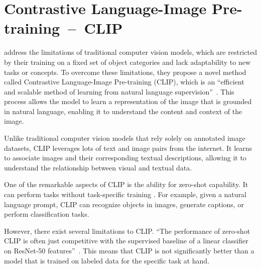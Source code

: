 \section{Contrastive Language-Image Pre-training~--~CLIP}\label{CLIP}

\citeauthor{radfordCLIP} address the limitations of traditional computer vision models, which are restricted by their training on a fixed set of object categories and lack adaptability to new tasks or concepts. To overcome these limitations, they propose a novel method called Contrastive Language-Image Pre-training (CLIP), which is an ``efficient and scalable method of learning from natural language supervision''~\citep{radfordCLIP}. This process allows the model to learn a representation of the image that is grounded in natural language, enabling it to understand the content and context of the image.

Unlike traditional computer vision models that rely solely on annotated image datasets, CLIP leverages lots of text and image pairs from the internet. It learns to associate images and their corresponding textual descriptions, allowing it to understand the relationship between visual and textual data.

One of the remarkable aspects of CLIP is the ability for zero-shot capability. It can perform tasks without task-specific training \citep{radfordCLIP}. For example, given a natural language prompt, CLIP can recognize objects in images, generate captions, or perform classification tasks.

However, there exist several limitations to CLIP\@. ``The performance of zero-shot CLIP is often just competitive with the supervised baseline of a linear classifier on ResNet-50 features''~\citep{radfordCLIP}.  This means that CLIP is not significantly better than a model that is trained on labeled data for the specific task at hand.